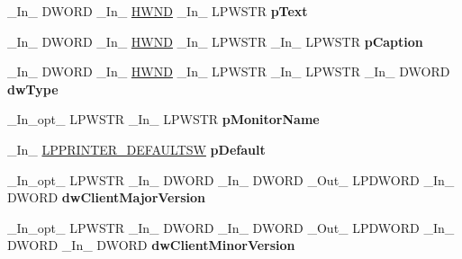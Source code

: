 \begin{DoxyCompactItemize}
\+\_\+\+In\+\_\+ D\+W\+O\+RD \+\_\+\+In\+\_\+ \hyperlink{interfacevoid}{H\+W\+ND} \+\_\+\+In\+\_\+ L\+P\+W\+S\+TR {\bfseries p\+Text}
\item 
\mbox{\label{struct___p_r_i_n_t_p_r_o_v_i_d_o_r_aff0520da8c923deda1bc58b565475530}} 
\+\_\+\+In\+\_\+ D\+W\+O\+RD \+\_\+\+In\+\_\+ \hyperlink{interfacevoid}{H\+W\+ND} \+\_\+\+In\+\_\+ L\+P\+W\+S\+TR \+\_\+\+In\+\_\+ L\+P\+W\+S\+TR {\bfseries p\+Caption}
\item 
\mbox{\label{struct___p_r_i_n_t_p_r_o_v_i_d_o_r_ac713b37ecf16eed93dccdc06d50d6fe9}} 
\+\_\+\+In\+\_\+ D\+W\+O\+RD \+\_\+\+In\+\_\+ \hyperlink{interfacevoid}{H\+W\+ND} \+\_\+\+In\+\_\+ L\+P\+W\+S\+TR \+\_\+\+In\+\_\+ L\+P\+W\+S\+TR \+\_\+\+In\+\_\+ D\+W\+O\+RD {\bfseries dw\+Type}
\item 
\mbox{\label{struct___p_r_i_n_t_p_r_o_v_i_d_o_r_a9958498bee4d3acb0791c2f414ab2ffa}} 
\+\_\+\+In\+\_\+opt\+\_\+ L\+P\+W\+S\+TR \+\_\+\+In\+\_\+ L\+P\+W\+S\+TR {\bfseries p\+Monitor\+Name}
\item 
\mbox{\label{struct___p_r_i_n_t_p_r_o_v_i_d_o_r_ad5df896fd20b0d6ebad046f940b3beff}} 
\+\_\+\+In\+\_\+ \hyperlink{struct___p_r_i_n_t_e_r___d_e_f_a_u_l_t_s_w}{L\+P\+P\+R\+I\+N\+T\+E\+R\+\_\+\+D\+E\+F\+A\+U\+L\+T\+SW} {\bfseries p\+Default}
\item 
\mbox{\label{struct___p_r_i_n_t_p_r_o_v_i_d_o_r_a8a0c61116d93032ac86c3ed90ee9d13c}} 
\+\_\+\+In\+\_\+opt\+\_\+ L\+P\+W\+S\+TR \+\_\+\+In\+\_\+ D\+W\+O\+RD \+\_\+\+In\+\_\+ D\+W\+O\+RD \+\_\+\+Out\+\_\+ L\+P\+D\+W\+O\+RD \+\_\+\+In\+\_\+ D\+W\+O\+RD {\bfseries dw\+Client\+Major\+Version}
\item 
\mbox{\label{struct___p_r_i_n_t_p_r_o_v_i_d_o_r_a7c6843ee8a9b007285676e542b4d0396}} 
\+\_\+\+In\+\_\+opt\+\_\+ L\+P\+W\+S\+TR \+\_\+\+In\+\_\+ D\+W\+O\+RD \+\_\+\+In\+\_\+ D\+W\+O\+RD \+\_\+\+Out\+\_\+ L\+P\+D\+W\+O\+RD \+\_\+\+In\+\_\+ D\+W\+O\+RD \+\_\+\+In\+\_\+ D\+W\+O\+RD {\bfseries dw\+Client\+Minor\+Version}
\item 
\mbox{\label{struct___p_r_i_n_t_p_r_o_v_i_d_o_r_a3d866e210b25f34d19dd39619237120f}} 

\end{DoxyCompactItemize}
